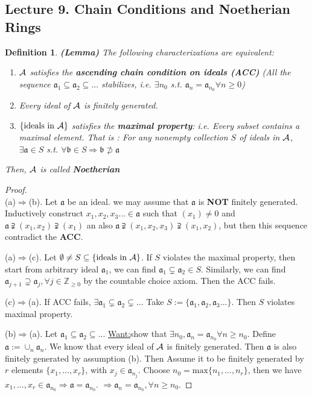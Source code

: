 \documentclass[11pt]{article}
\newtheorem{dfn}[thm]{Definition}
\newcommand{\intg}{\mathbb Z}
\newcommand{\sca}{{\mathfrak a}}
\newcommand{\scb}{{\mathfrak b}}
\newcommand{\cala}{{\cal A}}
\newcommand{\Lrta}{\Longrightarrow}
\begin{document}
\subsection{Lecture 9. Chain Conditions and Noetherian Rings}
\begin{dfn}
\textbf{(Lemma)} The following characterizations are equivalent:
\begin{enumerate}[label=(\alph*)]
\item $\cala$ satisfies the \textbf{ascending chain condition on ideals (ACC)} (All the sequence $\sca_1\subseteq \sca_2\subseteq ...$ stabilizes, i.e. $\exists n_0$ s.t. $\sca_n=\sca_{n_0} \forall n\geq 0$)
\item Every ideal of $\cala$ is finitely generated.
\item $\{\text{ideals in $\cala$}\}$ satisfies the \textbf{maximal property}: i.e. Every subset contains a maximal element. That is : For any nonempty collection $S$ of ideals in $\cala$, $\exists \sca\in S$ s.t. $\forall \scb\in S\Lrta \scb\not \supset \sca$
\end{enumerate}
Then, $\cala$ is called \textbf{Noetherian}
\end{dfn}
\begin{proof}\ \\
(a)$\Lrta$(b). Let $\sca$ be an ideal. we may assume that $\sca$ is \textbf{NOT} finitely generated. Inductively construct $x_1, x_2,x_3...\in \sca$ such that $(x_1)\neq 0$ and $\sca\supsetneqq(x_1,x_2)\supsetneqq(x_1)$ an also $\sca\supsetneqq(x_1,x_2,x_3)\supsetneqq(x_1,x_2)$, but then this sequence contradict the \textbf{ACC}.

(a)$\Lrta$(c). Let $\emptyset \neq S\subseteq \{\text{ideals in }\cala\}$. If $S$ violates the maximal property, then start from arbitrary ideal $\sca_1$, we can find $\sca_1\subsetneq \sca_2\in S$. Similarly, we can find $\sca_{j+1}\supsetneq \sca_j,\forall j\in\intg_{\geq 0}$ by the countable choice axiom. Then the ACC fails.

(c)$\Lrta $(a). If ACC fails, $\exists \sca_1\subsetneq \sca_2\subsetneq ...$ Take $S:=\{\sca_1,\sca_2,\sca_3...\}$. Then $S$ violates maximal property.

(b)$\Lrta$(a). Let $\sca_1\subseteq\sca_2\subseteq ...$ \underline{Want:}show that $\exists n_0,\sca_n=\sca_{n_0}\forall n\geq n_0$.
Define $\sca:=\cup_n \sca_n$. We know that every ideal of $\cala$ is finitely generated. Then $\sca$ is also finitely generated by assumption (b). Then Assume it to be finitely generated by $r$ elements $\{x_1,...,x_r\}$, with $x_j\in\sca_{n_j}$. Choose $n_0=\text{max}\{n_1,...,n_r\}$, then we have $x_1,...,x_r\in \sca_{n_0}\Lrta \sca=\sca_{n_0}$. $\Lrta \sca_n=\sca_{n_0},\forall n\geq n_0$.
\end{proof}
\end{document}
